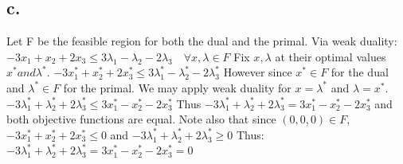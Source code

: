 \documentclass[10pt, letterpaper]{paper}
\begin{document}
\subsection*{c.}
Let F be the feasible region for both the dual and the primal.
Via weak duality: $-3x_1 + x_2 + 2x_3 \leq 3\lambda_1 -\lambda_2 - 2\lambda_3 \quad \forall x,\lambda \in F$ 
\newline
Fix $x,\lambda$ at their optimal values $x^* and \lambda^*$. 
\newline
$-3x_1^* + x_2^* + 2x_3^* \leq 3\lambda_1^* -\lambda_2^* - 2\lambda_3^*$
\newline
However since $x^* \in F$ for the dual and $\lambda^* \in F$ for the primal. We may apply weak duality for $x = \lambda^*$ and $\lambda = x^*$.
\newline
$-3\lambda_1^* + \lambda_2^* + 2\lambda_3^* \leq 3x_1^* -x_2^* - 2x_3^*$
\newline
Thus $-3\lambda_1^* + \lambda_2^* + 2\lambda_3^* = 3x_1^* -x_2^* - 2x_3^*$ and both objective functions are equal. \newline
Note also that since $(0,0,0) \in F,$
$-3x_1^* + x_2^* + 2x_3^* \leq 0$ and $-3\lambda_1^* + \lambda_2^* + 2\lambda_3^* \geq 0$ \newline
Thus: $-3\lambda_1^* + \lambda_2^* + 2\lambda_3^* = 3x_1^* -x_2^* - 2x_3^* = 0$
\end{document}
